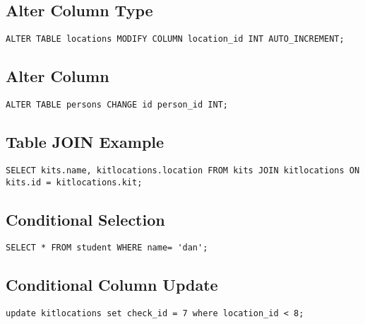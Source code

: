 \documentclass{article}
\begin{document}
\begin{multicols}{3}
\subsection{Alter Column Type}
\lstinline|ALTER TABLE locations MODIFY COLUMN location_id INT AUTO_INCREMENT;|

\subsection{Alter Column}
\lstinline|ALTER TABLE persons CHANGE id person_id INT;|

\subsection{Table JOIN Example}
\lstinline|SELECT kits.name, kitlocations.location FROM kits JOIN kitlocations ON kits.id = kitlocations.kit;|

\subsection{Conditional Selection}
\lstinline|SELECT * FROM student WHERE name= 'dan';|

\subsection{Conditional Column Update}
\lstinline|update kitlocations set check_id = 7 where location_id < 8;|
\end{multicols}
\end{document}
